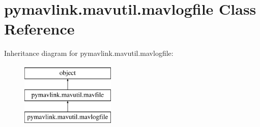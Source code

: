 \hypertarget{classpymavlink_1_1mavutil_1_1mavlogfile}{}\section{pymavlink.\+mavutil.\+mavlogfile Class Reference}
\label{classpymavlink_1_1mavutil_1_1mavlogfile}
Inheritance diagram for pymavlink.\+mavutil.\+mavlogfile\+:\begin{figure}[H]
\begin{center}
\leavevmode
\includegraphics[height=3.000000cm]{classpymavlink_1_1mavutil_1_1mavlogfile}
\end{center}
\end{figure}
